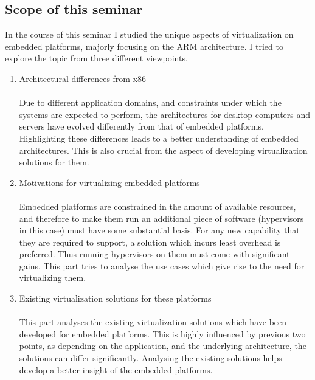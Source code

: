 \documentclass[seminar,twoside]{iitbreport}
\begin{document}
\subsection{Scope of this seminar}
In the course of this seminar I studied the unique aspects of virtualization on embedded platforms, majorly focusing on the ARM architecture.
I tried to explore the topic from three different viewpoints. 
\begin{enumerate}
 \item Architectural differences from x86\\\\
 Due to different application domains, and constraints under which the systems are expected to perform, the architectures for desktop computers and servers have evolved
 differently from that of embedded platforms. Highlighting these differences leads to a better understanding of embedded architectures. This is also crucial from the 
 aspect of developing virtualization solutions for them.
 \item Motivations for virtualizing embedded platforms\\\\
 Embedded platforms are constrained in the amount of available resources, and therefore to make them run an additional piece of software (hypervisors in this case) must have some 
 substantial basis. For any new capability that they are required to support, a solution which incurs least overhead is preferred. Thus running hypervisors on
 them must come with significant gains.
 This part tries to analyse the use cases which give rise to the need for virtualizing them.
 \item Existing virtualization solutions for these platforms\\\\
 This part analyses the existing virtualization solutions which have been developed for embedded platforms. This is highly influenced by previous two points, as depending on
 the application, and the underlying architecture, the solutions can differ significantly. Analysing the existing solutions helps develop a better insight of the embedded platforms.
\end{enumerate}


\end{document}
